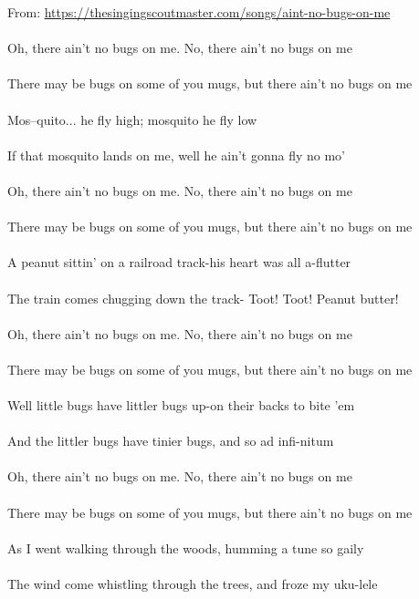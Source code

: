 
From: \url{https://thesingingscoutmaster.com/songs/aint-no-bugs-on-me}\\
\\
Oh, there ain't no bugs on me. No, there ain't no bugs on me\\
\\
There may be bugs on some of you mugs, but there ain't no bugs on me \\
\\
Mos--quito... he fly high; mosquito he fly low\\
\\
If that mosquito lands on me, well he ain't gonna fly no mo' \\
\\
Oh, there ain't no bugs on me. No, there ain't no bugs on me\\
\\
There may be bugs on some of you mugs, but there ain't no bugs on me \\
\\
A peanut sittin' on a railroad track-his heart was all a-flutter\\
\\
The train comes chugging down the track- Toot! Toot! Peanut butter! \\
\\
Oh, there ain't no bugs on me. No, there ain't no bugs on me\\
\\
There may be bugs on some of you mugs, but there ain't no bugs on me \\
\\
Well little bugs have littler bugs up-on their backs to bite 'em\\
\\
And the littler bugs have tinier bugs, and so ad infi-nitum \\
\\
Oh, there ain't no bugs on me. No, there ain't no bugs on me\\
\\
There may be bugs on some of you mugs, but there ain't no bugs on me \\
\\
As I went walking through the woods, humming a tune so gaily\\
\\
The wind come whistling through the trees, and froze my uku-lele \\
\\
